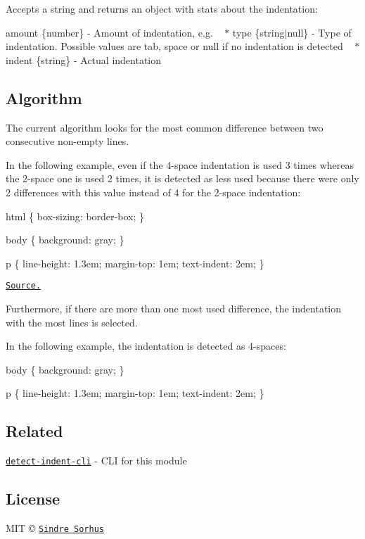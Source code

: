 Accepts a string and returns an object with stats about the indentation\+: ~\newline

\begin{DoxyItemize}
\item {\ttfamily amount} \{number\} -\/ Amount of indentation, e.\+g. {} ~\newline
$\ast$ {\ttfamily type} \{string$\vert$null\} -\/ Type of indentation. Possible values are {\ttfamily tab}, {\ttfamily space} or {\ttfamily null} if no indentation is detected ~\newline
$\ast$ {\ttfamily indent} \{string\} -\/ Actual indentation
\end{DoxyItemize}

\subsection*{Algorithm}

The current algorithm looks for the most common difference between two consecutive non-\/empty lines.

In the following example, even if the 4-\/space indentation is used 3 times whereas the 2-\/space one is used 2 times, it is detected as less used because there were only 2 differences with this value instead of 4 for the 2-\/space indentation\+:


\begin{DoxyCode}
html \{
  box-sizing: border-box;
\}

body \{
  background: gray;
\}

p \{
    line-height: 1.3em;
    margin-top: 1em;
    text-indent: 2em;
\}
\end{DoxyCode}


\href{https://medium.com/@heatherarthur/detecting-code-indentation-eff3ed0fb56b#3918}{\tt Source.}

Furthermore, if there are more than one most used difference, the indentation with the most lines is selected.

In the following example, the indentation is detected as 4-\/spaces\+:


\begin{DoxyCode}
body \{
  background: gray;
\}

p \{
    line-height: 1.3em;
    margin-top: 1em;
    text-indent: 2em;
\}
\end{DoxyCode}


\subsection*{Related}


\begin{DoxyItemize}
\item \href{https://github.com/sindresorhus/detect-indent-cli}{\tt detect-\/indent-\/cli} -\/ C\+LI for this module
\end{DoxyItemize}

\subsection*{License}

M\+IT © \href{http://sindresorhus.com}{\tt Sindre Sorhus} 